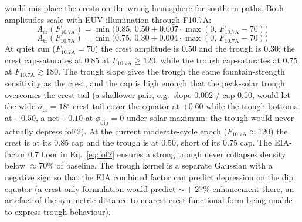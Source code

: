 \documentclass[11pt,a4paper]{article}
\newcommand{\degree}{\ensuremath{{}^\circ}}
\begin{document}
would mis-place the crests on the wrong hemisphere for southern
paths. Both amplitudes scale with EUV
illumination through F10.7A:
\begin{equation}\label{eq:eia-amp}
  A_{\text{cr}}(F_{10.7\text{A}}) =
    \min\!\bigl(0.85,\,
      0.50 + 0.007\cdot\max(0,\,F_{10.7\text{A}} - 70)\bigr)
\end{equation}
\begin{equation}\label{eq:eia-tr-amp}
  A_{\text{tr}}(F_{10.7\text{A}}) =
    \min\!\bigl(0.75,\,
      0.30 + 0.004\cdot\max(0,\,F_{10.7\text{A}} - 70)\bigr)
\end{equation}
At quiet sun ($F_{10.7\text{A}} = 70$) the crest amplitude is
$0.50$ and the trough is $0.30$; the crest cap-saturates at
$0.85$ at $F_{10.7\text{A}} \ge 120$, while the trough
cap-saturates at $0.75$ at $F_{10.7\text{A}} \gtrsim 180$.  The
trough slope gives the trough the same
fountain-strength sensitivity as the crest, and the cap is high
enough that the peak-solar trough overcomes the crest tail (a
shallower pair, e.g.\ slope $0.002$ / cap $0.50$, would let the
wide $\sigma_{\text{cr}} = 18\degree$ crest tail cover the
equator at $+0.60$ while the trough bottoms at $-0.50$, a net
$+0.10$ at $\phi_{\text{dip}} = 0$ under solar maximum: the
trough would never actually depress foF2).  At the
current moderate-cycle epoch ($F_{10.7\text{A}} \approx 120$)
the crest is at its $0.85$ cap and the trough is at $0.50$,
short of its $0.75$ cap.  The EIA-factor $0.7$ floor
in Eq.~\ref{eq:fof2}
ensures a strong trough never collapses density below $\approx
70\%$ of baseline.  The trough kernel is a separate Gaussian
with a negative sign so that the EIA combined factor can
predict depression on the dip equator (a crest-only formulation
would predict $\sim\!+27\%$ enhancement there, an artefact of
the symmetric distance-to-nearest-crest functional form being
unable to express trough behaviour).
\end{document}
